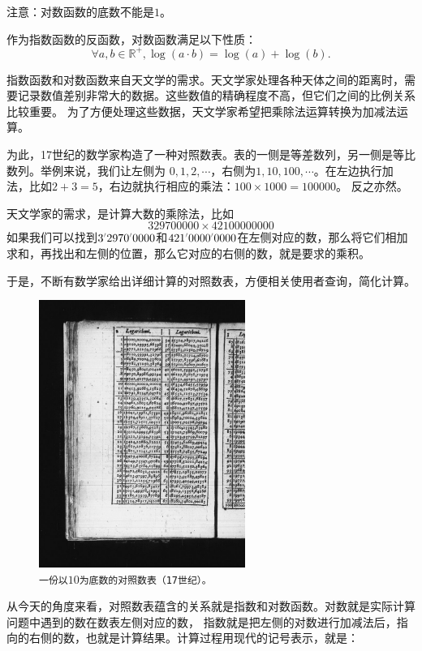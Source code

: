 \documentclass[12pt,UTF8]{ctexbook}
\newcommand{\dlim}[1]{^{\color{gray}\prime}#1}
\begin{document}
注意：对数函数的底数不能是$1$。

作为指数函数的反函数，对数函数满足以下性质：
$$ \forall a, b\in\mathbb{R}^+, \log(a\cdot b) = \log(a) + \log(b). $$

指数函数和对数函数来自天文学的需求。天文学家处理各种天体之间的距离时，需要记录数值差别非常大的数据。这些数值的精确程度不高，但它们之间的比例关系比较重要。
为了方便处理这些数据，天文学家希望把乘除法运算转换为加减法运算。

为此，17世纪的数学家构造了一种对照数表。表的一侧是等差数列，另一侧是等比数列。举例来说，我们让左侧为
$0,1,2,\cdots$，右侧为$1, 10, 100, \cdots$。在左边执行加法，比如$2+3=5$，右边就执行相应的乘法：$100 \times 1000 = 100000$。
反之亦然。

天文学家的需求，是计算大数的乘除法，比如
$$329700000 \times 42100000000$$
如果我们可以找到$3\dlim{2970}\dlim{0000}$和$421\dlim{0000}\dlim{0000}$在左侧对应的数，那么将它们相加求和，再找出和左侧的位置，那么它对应的右侧的数，就是要求的乘积。

于是，不断有数学家给出详细计算的对照数表，方便相关使用者查询，简化计算。

\begin{figure}[h]
    \vspace{4pt}
    \centering
    \includegraphics[width=0.6\textwidth]{Logarithmorum_Chilias_Prima_page_0-67.jpg}
    \caption*{\texttt{一份以}$10$\texttt{为底数的对照数表（17世纪）。}}
\end{figure}

从今天的角度来看，对照数表蕴含的关系就是指数和对数函数。对数就是实际计算问题中遇到的数在数表左侧对应的数，
指数就是把左侧的对数进行加减法后，指向的右侧的数，也就是计算结果。计算过程用现代的记号表示，就是：
\end{document}
